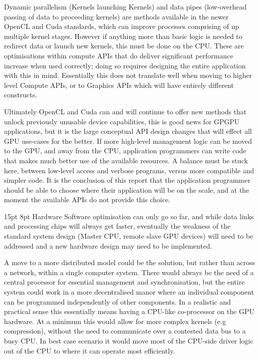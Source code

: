\documentclass[12pt,a4paper]{article}
\makeatletter
\renewcommand\subsection{\@startsection {subsection}{1}{2mm} %
                               {15pt} %
                               {8pt} %
                               {\fontsize{13pt}{1em}\bfseries}}
\makeatother
\begin{document}
Dynamic parallelism (Kernels launching Kernels) and data pipes (low-overhead passing of data to proceeding kernels) are methods available in the newer OpenCL and Cuda standards, which can improve processes comprising of up multiple kernel stages. However if anything more than basic logic is needed to redirect data or launch new kernels, this must be done on the CPU. These are optimisations within compute APIs that do deliver significant performance increase when used correctly; doing so requires designing the entire application with this in mind. Essentially this does not translate well when moving to higher level Compute APIs, or to Graphics APIs which will have entirely different constructs.

Ultimately OpenCL and Cuda can and will continue to offer new methods that unlock previously unusable device capabilities, this is good news for GPGPU applications, but it is the large conceptual API design changes that will effect all GPU use-cases for the better. If more high-level management logic can be moved to the GPU, and away from the CPU, application programmers can write code that makes much better use of the available resources. A balance must be stuck here, between low-level access and verbose programs, versus more compatible and simpler code. It is the conclusion of this report that the application programmer should be able to choose where their application will be on the scale, and at the moment the available APIs do not provide this choice.

\subsection{Hardware}
Software optimisation can only go so far, and while data links and processing chips will always get faster, eventually the weakness of the standard system design (Master CPU, remote slave GPU devices) will need to be addressed and a new hardware design may need to be implemented.

A move to a more distributed model could be the solution, but rather than across a network, within a single computer system. There would always be the need of a central processor for essential management and synchronisation, but the entire system could work in a more decentralised manor where an individual component can be programmed independently of other components. In a realistic and practical sense this essentially means having a CPU-like co-processor on the GPU hardware. At a minimum this would allow for more complex kernels (e.g compression), without the need to communicate over a contested data bus to a busy CPU. In best case scenario it would move most of the CPU-side driver logic out of the CPU to where it can operate most efficiently.
\end{document}
